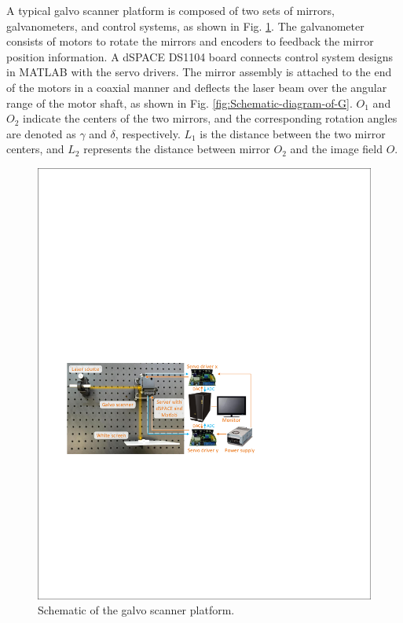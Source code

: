 \documentclass [11pt, proquest] {uwthesis}[2020/02/24]
\begin{document}
A typical galvo scanner platform is composed of two sets of mirrors,
galvanometers, and control systems, as shown in Fig. \ref{fig:Schematic-of-hardware-LS}. The galvanometer consists of motors to rotate the mirrors and encoders
to feedback the mirror position information. A dSPACE DS1104 board connects control system designs in MATLAB with the servo drivers. The mirror assembly is
attached to the end of the motors in a coaxial manner and deflects
the laser beam over the angular range of the motor shaft, as shown
in Fig. \ref{fig:Schematic-diagram-of-G}. $O_{1}$ and $O_{2}$ indicate
the centers of the two mirrors, and the corresponding rotation angles
are denoted as $\gamma$ and $\delta$, respectively. $L_{1}$ is
the distance between the two mirror centers, and $L_{2}$ represents
the distance between mirror $O_{2}$ and the image field $O$.
\begin{figure}[!ht]
\begin{centering}
\includegraphics[width=12cm]{Fractional-order-RC/system setup}
\par\end{centering}
\caption{\label{fig:Schematic-of-hardware-LS}Schematic of the galvo scanner platform.}
\end{figure}
\end{document}
